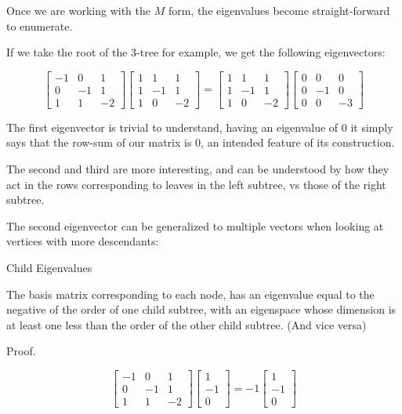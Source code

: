 \documentclass[10pt,a4paper]{report}
\begin{document}
Once we are working with the $M$ form, the eigenvalues become straight-forward to enumerate.

If we take the root of the 3-tree for example, we get the following
eigenvectors:

\begin{equation*}
\left[\begin{matrix}
	-1 & 0 & 1\\
	0 & -1 & 1\\
	1 & 1 & -2
\end{matrix}\right]
\left[\begin{matrix}
	1 & 1 & 1\\
	1 & -1 & 1\\
	1 & 0 & -2
\end{matrix}\right]
=
\left[\begin{matrix}
	1 & 1 & 1\\
	1 & -1 & 1\\
	1 & 0 & -2
\end{matrix}\right]
\left[\begin{matrix}
	0 & 0 & 0\\
	0 & -1 & 0\\
	0 & 0 & -3
\end{matrix}\right]
\end{equation*}

The first eigenvector is trivial to understand, having an eigenvalue of 0 it
simply says that the row-sum of our matrix is 0, an intended feature of its
construction.

The second and third are more interesting, and can be understood by how they
act in the rows corresponding to leaves in the left subtree, vs those of the
right subtree.

The second eigenvector can be generalized to multiple vectors when looking at
vertices with more descendants:

\begin{lemma} Child Eigenvalues

	The basis matrix corresponding to each node, has an eigenvalue equal to the
	negative of the order of one child subtree, with an eigenspace whose
	dimension is at least one less than the order of the other child subtree.
	(And vice versa)
\end{lemma}

Proof.

\begin{equation*}
\left[\begin{matrix}
	-1 & 0 & 1\\
	0 & -1 & 1\\
	1 & 1 & -2
\end{matrix}\right]
\left[\begin{matrix}
	1\\
	-1\\
	0
\end{matrix}\right]
=
-1
\left[\begin{matrix}
	1\\
	-1\\
	0
\end{matrix}\right]
\end{equation*}
\end{document}
